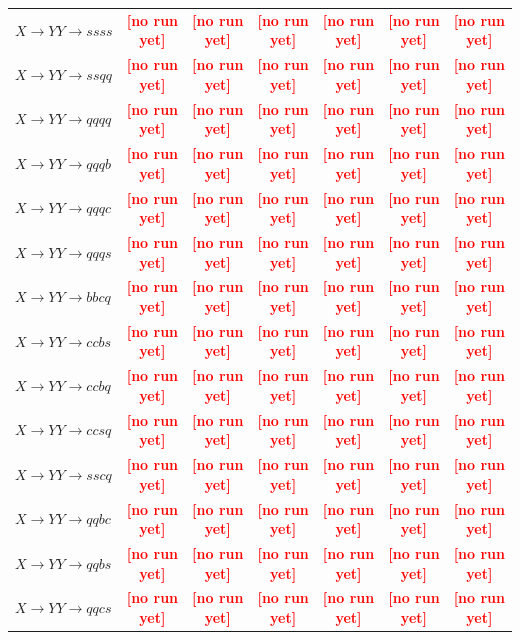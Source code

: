 \documentclass[12pt]{article}   %
\newcommand{\pending}[1]{\textcolor{red}{\textbf{[#1]}}}
\begin{document}
\begin{landscape}
{\begin{longtable}{@{\extracolsep{\fill}}lcccccc@{}}
$X\to YY\to ssss$ & \pending{no run yet} & \pending{no run yet} & \pending{no run yet} & \pending{no run yet} & \pending{no run yet} & \pending{no run yet} \\
$X\to YY\to ssqq$ & \pending{no run yet} & \pending{no run yet} & \pending{no run yet} & \pending{no run yet} & \pending{no run yet} & \pending{no run yet} \\
$X\to YY\to qqqq$ & \pending{no run yet} & \pending{no run yet} & \pending{no run yet} & \pending{no run yet} & \pending{no run yet} & \pending{no run yet} \\
$X\to YY\to qqqb$ & \pending{no run yet} & \pending{no run yet} & \pending{no run yet} & \pending{no run yet} & \pending{no run yet} & \pending{no run yet} \\
$X\to YY\to qqqc$ & \pending{no run yet} & \pending{no run yet} & \pending{no run yet} & \pending{no run yet} & \pending{no run yet} & \pending{no run yet} \\
$X\to YY\to qqqs$ & \pending{no run yet} & \pending{no run yet} & \pending{no run yet} & \pending{no run yet} & \pending{no run yet} & \pending{no run yet} \\
$X\to YY\to bbcq$ & \pending{no run yet} & \pending{no run yet} & \pending{no run yet} & \pending{no run yet} & \pending{no run yet} & \pending{no run yet} \\
$X\to YY\to ccbs$ & \pending{no run yet} & \pending{no run yet} & \pending{no run yet} & \pending{no run yet} & \pending{no run yet} & \pending{no run yet} \\
$X\to YY\to ccbq$ & \pending{no run yet} & \pending{no run yet} & \pending{no run yet} & \pending{no run yet} & \pending{no run yet} & \pending{no run yet} \\
$X\to YY\to ccsq$ & \pending{no run yet} & \pending{no run yet} & \pending{no run yet} & \pending{no run yet} & \pending{no run yet} & \pending{no run yet} \\
$X\to YY\to sscq$ & \pending{no run yet} & \pending{no run yet} & \pending{no run yet} & \pending{no run yet} & \pending{no run yet} & \pending{no run yet} \\
$X\to YY\to qqbc$ & \pending{no run yet} & \pending{no run yet} & \pending{no run yet} & \pending{no run yet} & \pending{no run yet} & \pending{no run yet} \\
$X\to YY\to qqbs$ & \pending{no run yet} & \pending{no run yet} & \pending{no run yet} & \pending{no run yet} & \pending{no run yet} & \pending{no run yet} \\
$X\to YY\to qqcs$ & \pending{no run yet} & \pending{no run yet} & \pending{no run yet} & \pending{no run yet} & \pending{no run yet} & \pending{no run yet} \\

\end{longtable}}
\end{landscape}
\end{document}
